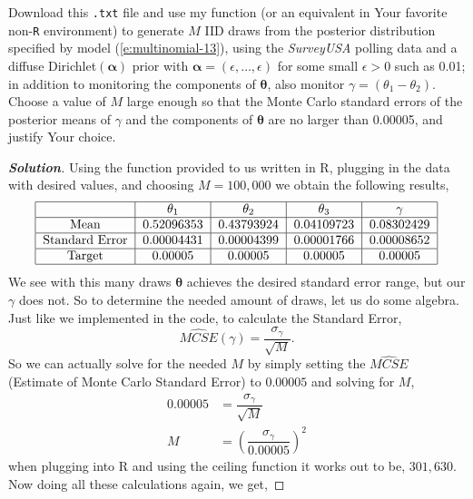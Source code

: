 \documentclass[12pt]{article}
\newenvironment{solution}{\begin{tcolorbox}[breakable]\begin{proof}[\textbf{\textit{Solution}}] }{\end{proof}\end{tcolorbox}}
\begin{document}
\begin{itemize}
\begin{itemize}
\begin{itemize}
Download this \texttt{.txt} file and use my function (or an equivalent in Your favorite non-\texttt{R} environment) to generate $M$ IID draws from the posterior distribution specified by model (\ref{e:multinomial-13}), using the \textit{SurveyUSA} polling data and a diffuse Dirichlet$( \bm{ \alpha } )$ prior with $\bm{ \alpha } = ( \epsilon, \dots, \epsilon )$ for some small $\epsilon > 0$ such as 0.01; in addition to monitoring the components of $\bm{ \theta }$, also monitor $\gamma = ( \theta_1 - \theta_2 )$. Choose a value of $M$ large enough so that the Monte Carlo standard errors of the posterior means of $\gamma$ and the components of $\bm{ \theta }$ are no larger than 0.00005, and justify Your choice. \textit{\fbox{\textbf{[15 points]}}}
\begin{solution}
    Using the function provided to us written in R, plugging in the data with desired values, and choosing $M = 100,000$ we obtain the following results,
    \begin{align*}
        \begin{tabular}{|c | c | c | c | c |}
            \hline
            &$\theta_1$ & $\theta_2$ & $\theta_3$ & $\gamma$ \\
            \hline 
            Mean &$0.52096353$ & $0.43793924$ & $0.04109723$ & $0.08302429$ \\
            \hline
            Standard Error &$0.00004431$ & $0.00004399$ & $0.00001766$ & $0.00008652$ \\
            \hline
            Target & $0.00005$ & $0.00005$ & $0.00005$ & $0.00005$ \\
            \hline
        \end{tabular}
    \end{align*}
    We see with this many draws $\bm{\theta}$ achieves the desired standard error range, but our $\gamma$ does not. So to determine the needed amount of draws, let us do some algebra. Just like we implemented in the code, to calculate the Standard Error,\[\widehat{MCSE}(\gamma) = \dfrac{\sigma_{\gamma}}{\sqrt{M}}.\]
    So we can actually solve for the needed $M$ by simply setting the $\widehat{MCSE}$ (Estimate of Monte Carlo Standard Error) to $0.00005$ and solving for $M$,
    \begin{align*}
        0.00005 &= \dfrac{\sigma_{\gamma}}{\sqrt{M}} \\ 
        M &= (\dfrac{\sigma_\gamma}{0.00005})^{2} 
    \end{align*}
    when plugging into R and using the ceiling function it works out to be, $301,630$. Now doing all these calculations again,  we get,

\end{solution}
\end{itemize}
\end{itemize}
\end{itemize}
\end{document}
